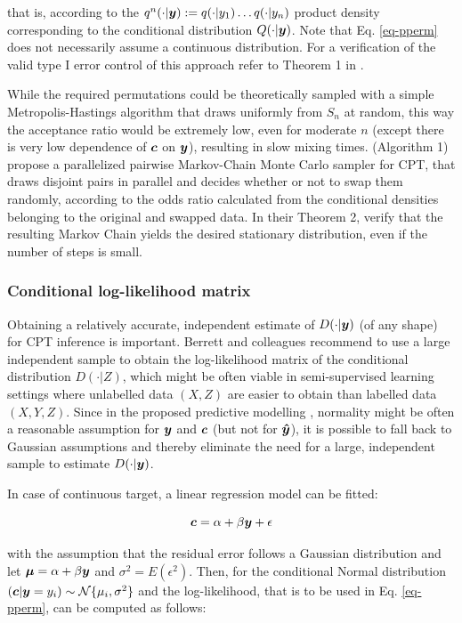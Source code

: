 \documentclass{article}
\begin{document}
that is, according to the $q^n(\cdot|\boldsymbol{y}) := q(\cdot | y_1) \dots q(\cdot|y_n)$ product density corresponding to the conditional distribution $Q(\cdot|\boldsymbol{y})$. Note that Eq. \ref{eq-pperm} does not necessarily assume a continuous distribution.
For a verification of the valid type I error control of this approach refer to Theorem 1 in \citep{berrett2020conditional}.

While the required permutations could be theoretically sampled with a simple Metropolis-Hastings algorithm that draws uniformly from $S_n$ at random, this way the acceptance ratio would be extremely low, even for moderate $n$ (except there is very low dependence of $\boldsymbol{c}$ on $\boldsymbol{y}$), resulting in slow mixing times. \cite{berrett2020conditional} (Algorithm 1) propose a parallelized pairwise Markov-Chain Monte Carlo sampler for CPT, that draws disjoint pairs in parallel and decides whether or not to swap them randomly, according to the odds ratio calculated from the conditional densities belonging to the original and swapped data. In their Theorem 2, \cite{berrett2020conditional} verify that the resulting Markov Chain yields the desired stationary distribution, even if the number of steps is small.

\subsubsection*{Conditional log-likelihood matrix}


Obtaining a relatively accurate, independent estimate of $D(\cdot|\boldsymbol{y})$ (of any shape) for CPT inference is important. Berrett and colleagues recommend to use a large independent sample to obtain the log-likelihood matrix of the conditional distribution $D(\cdot|Z)$, which might be often viable in semi-supervised learning settings where unlabelled data $(X, Z)$ are easier to obtain than labelled data $(X, Y, Z)$.
Since in the proposed predictive modelling , normality might be often a reasonable assumption for $\boldsymbol{y}$ and $\boldsymbol{c}$ (but not for $\boldsymbol{\hat{y}}$), it is possible to fall back to Gaussian assumptions and thereby eliminate the need for a large, independent sample to estimate $D(\cdot|\boldsymbol{y})$.

In case of continuous target, a linear regression model  can be fitted:

\begin{equation}
    \label{eq:linreg}
    \boldsymbol{c} = \alpha + \beta \boldsymbol{y} + \epsilon
\end{equation}


with the assumption that the residual error follows a Gaussian distribution and let $\boldsymbol{\mu} = \alpha + \beta \boldsymbol{y}$ and $\sigma^2 = E(\epsilon^2)$. Then, for the conditional Normal distribution $ (\boldsymbol{c}|\boldsymbol{y}=y_i) \sim \mathcal{N}\{\mu_i, \sigma^2\}$ and the log-likelihood, that is to be used in Eq. \ref{eq-pperm}, can be computed as follows:
\end{document}
